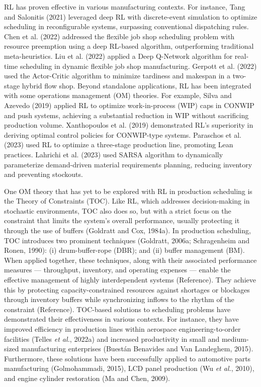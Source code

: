 RL has proven effective in various manufacturing contexts. For instance,
Tang and Salonitis (\colorbox{yellow!40}{2021}) leveraged deep RL with discrete-event
simulation to optimize scheduling in reconfigurable systems, surpassing
conventional dispatching rules. Chen et al. (\colorbox{yellow!40}{2022}) addressed the
flexible job shop scheduling problem with resource preemption using a
deep RL-based algorithm, outperforming traditional meta-heuristics. Liu
et al. (\colorbox{yellow!40}{2022}) applied a Deep Q-Network algorithm for real-time
scheduling in dynamic flexible job shop manufacturing. Gerpott et al.
(\colorbox{yellow!40}{2022}) used the Actor-Critic algorithm to minimize tardiness and
makespan in a two-stage hybrid flow shop. Beyond standalone
applications, RL has been integrated with some operations management
(OM) theories. For example, Silva and Azevedo (\colorbox{yellow!40}{2019}) applied RL to
optimize work-in-process (WIP) caps in CONWIP and push systems,
achieving a substantial reduction in WIP without sacrificing production
volume. Xanthopoulos et al. (\colorbox{yellow!40}{2019}) demonstrated RL's superiority in
deriving optimal control policies for CONWIP-type systems. Paraschos et
al. (\colorbox{yellow!40}{2023}) used RL to optimize a three-stage production line,
promoting Lean practices. Lahrichi et al. (\colorbox{yellow!40}{2023}) used SARSA
algorithm to dynamically parameterize demand-driven material
requirements planning, reducing inventory and preventing stockouts.

One OM theory that has yet to be explored with RL in production
scheduling is the Theory of Constraints (TOC). Like RL, which addresses
decision-making in stochastic environments, TOC also does so, but with a
strict focus on the constraint that limits the system's overall
performance, usually protecting it through the use of buffers (Goldratt
and Cox, 1984a). In production scheduling, TOC introduces two prominent
techniques (Goldratt, 2006a; Schragenheim and Ronen, 1990): (i)
drum-buffer-rope (DBR); and (ii) buffer management (BM). When applied
together, these techniques, along with their associated performance
measures --- throughput, inventory, and operating expenses --- enable
the effective management of highly interdependent systems
(\colorbox{yellow!40}{Reference}). They achieve this by protecting capacity-constrained
resources against shortages or blockages through inventory buffers while
synchronizing inflows to the rhythm of the constraint (\colorbox{yellow!40}{Reference}).
TOC-based solutions to scheduling problems have demonstrated their
effectiveness in various contexts. For instance, they have improved
efficiency in production lines within aerospace engineering-to-order
facilities (Telles \emph{et al.}, 2022a) and increased productivity in
small and medium-sized manufacturing enterprises (Buestán Benavides and
Van Landeghem, 2015). Furthermore, these solutions have been
successfully applied to automotive parts manufacturing (Golmohammadi,
2015), LCD panel production (Wu \emph{et al.}, 2010), and engine
cylinder restoration (Ma and Chen, 2009).

